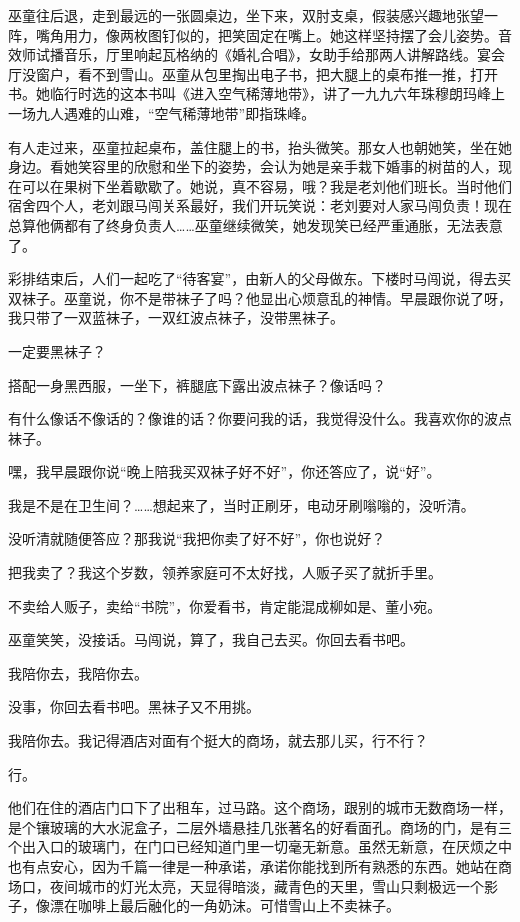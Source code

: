 \documentclass[lang=cn,newtx,12pt,scheme=chinese]{elegantbook}
\begin{document}
巫童往后退，走到最远的一张圆桌边，坐下来，双肘支桌，假装感兴趣地张望一阵，嘴角用力，像两枚图钉似的，把笑固定在嘴上。她这样坚持摆了会儿姿势。音效师试播音乐，厅里响起瓦格纳的《婚礼合唱》，女助手给那两人讲解路线。宴会厅没窗户，看不到雪山。巫童从包里掏出电子书，把大腿上的桌布推一推，打开书。她临行时选的这本书叫《进入空气稀薄地带》，讲了一九九六年珠穆朗玛峰上一场九人遇难的山难，“空气稀薄地带”即指珠峰。

有人走过来，巫童拉起桌布，盖住腿上的书，抬头微笑。那女人也朝她笑，坐在她身边。看她笑容里的欣慰和坐下的姿势，会认为她是亲手栽下婚事的树苗的人，现在可以在果树下坐着歇歇了。她说，真不容易，哦？我是老刘他们班长。当时他们宿舍四个人，老刘跟马闯关系最好，我们开玩笑说：老刘要对人家马闯负责！现在总算他俩都有了终身负责人……巫童继续微笑，她发现笑已经严重通胀，无法表意了。

彩排结束后，人们一起吃了“待客宴”，由新人的父母做东。下楼时马闯说，得去买双袜子。巫童说，你不是带袜子了吗？他显出心烦意乱的神情。早晨跟你说了呀，我只带了一双蓝袜子，一双红波点袜子，没带黑袜子。

一定要黑袜子？

搭配一身黑西服，一坐下，裤腿底下露出波点袜子？像话吗？

有什么像话不像话的？像谁的话？你要问我的话，我觉得没什么。我喜欢你的波点袜子。

嘿，我早晨跟你说“晚上陪我买双袜子好不好”，你还答应了，说“好”。

我是不是在卫生间？……想起来了，当时正刷牙，电动牙刷嗡嗡的，没听清。

没听清就随便答应？那我说“我把你卖了好不好”，你也说好？

把我卖了？我这个岁数，领养家庭可不太好找，人贩子买了就折手里。

不卖给人贩子，卖给“书院”，你爱看书，肯定能混成柳如是、董小宛。

巫童笑笑，没接话。马闯说，算了，我自己去买。你回去看书吧。

我陪你去，我陪你去。

没事，你回去看书吧。黑袜子又不用挑。

我陪你去。我记得酒店对面有个挺大的商场，就去那儿买，行不行？

行。

他们在住的酒店门口下了出租车，过马路。这个商场，跟别的城市无数商场一样，是个镶玻璃的大水泥盒子，二层外墙悬挂几张著名的好看面孔。商场的门，是有三个出入口的玻璃门，在门口已经知道门里一切毫无新意。虽然无新意，在厌烦之中也有点安心，因为千篇一律是一种承诺，承诺你能找到所有熟悉的东西。她站在商场口，夜间城市的灯光太亮，天显得暗淡，藏青色的天里，雪山只剩极远一个影子，像漂在咖啡上最后融化的一角奶沫。可惜雪山上不卖袜子。
\end{document}
